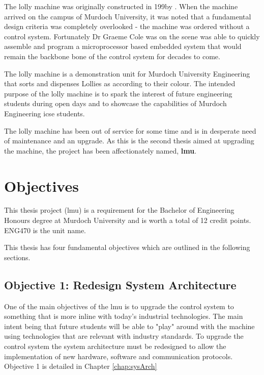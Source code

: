 The lolly machine was originally constructed in 199\X by \X. When the machine arrived on the campus of Murdoch University, it was noted that a fundamental design criteria was completely overlooked - the machine was ordered without a control system. Fortunately Dr Graeme Cole was on the scene was able to quickly assemble and program a microprocessor based embedded system that would remain the backbone bone of the control system for decades to come. 

The lolly machine is a demonstration unit for Murdoch University Engineering that sorts and dispenses Lollies as according to their colour. The intended purpose of the lolly machine is to spark the interest of future engineering students during open days and to showcase the capabilities of Murdoch Engineering \acrlong{icse} students.

The lolly machine has been out of service for some time and is in desperate need of maintenance and an upgrade. As this is the second thesis aimed at upgrading the machine, the project has been affectionately named, \textbf{\acrfull{lmu}}.


\section{Objectives}
   This thesis project (\acrfull{lmu}) is a requirement for the Bachelor of Engineering Honours degree at Murdoch University and is worth a total of 12 credit points. ENG470 is the unit name.
   
   This thesis  has four fundamental objectives which are outlined in the following sections.
   
    
    \subsection{Objective 1: Redesign System Architecture}
        One of the main objectives of the \acrshort{lmu} is to upgrade the control system to something that is more inline with today's industrial technologies. The main intent being that future students will be able to  "play" around with the machine using technologies that are relevant with industry standards. To upgrade the control system the system architecture must be redesigned to allow the implementation of new hardware, software and communication protocols. Objective 1 is detailed in Chapter \ref{chap:sysArch}
        
